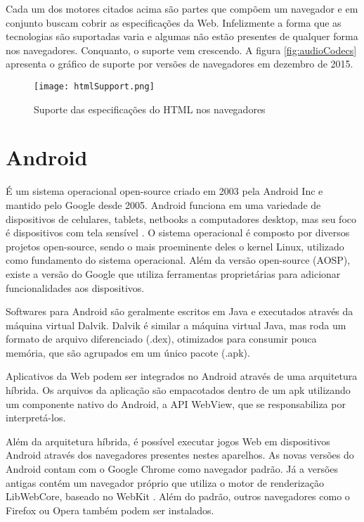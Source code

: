 Cada um dos motores citados acima são partes que compõem um
navegador e em conjunto buscam cobrir as especificações da Web.
Infelizmente a forma que as tecnologias são suportadas varia e algumas
não estão presentes de qualquer forma nos navegadores. Conquanto,
o suporte vem crescendo. A figura \ref{fig:audioCodecs} apresenta o
gráfico de suporte por versões de navegadores em dezembro de 2015.

\begin{figure}[H]
    \centering
    \texttt{[image: htmlSupport.png]}
	\caption{Suporte das especificações do HTML nos navegadores}
    \label{fig:htmlSupport}
\end{figure}

\section{Android}

É um sistema operacional open-source criado em 2003 pela Android
Inc e mantido pelo Google desde 2005. Android funciona em uma
variedade de dispositivos de celulares, tablets, netbooks a
computadores desktop, mas seu foco é dispositivos com tela sensível
\autocite{chromeVsAndroid}. O sistema operacional é composto por
diversos projetos open-source, sendo o mais proeminente deles o kernel
Linux, utilizado como fundamento do sistema operacional. Além
da versão open-source (AOSP), existe a versão do Google que utiliza
ferramentas proprietárias  para adicionar funcionalidades aos dispositivos.

Softwares para Android são geralmente escritos em Java e executados
através da máquina virtual Dalvik. Dalvik é similar a máquina
virtual Java, mas roda um formato de arquivo diferenciado (.dex),
otimizados para consumir pouca memória, que são agrupados em um único
pacote (.apk).

Aplicativos da Web podem ser integrados no Android através de uma
arquitetura híbrida. Os arquivos da aplicação são empacotados dentro
de um apk utilizando um componente nativo do Android, a API WebView, que
se responsabiliza por interpretá-los.

Além da arquitetura híbrida, é possível executar jogos Web em
dispositivos Android através dos navegadores presentes nestes
aparelhos. As novas versões do Android contam com o Google Chrome como
navegador padrão. Já a versões antigas contém um navegador próprio
que utiliza o motor de renderização LibWebCore, baseado no WebKit
\autocite{comparisonPlatforms}. Além do padrão, outros navegadores
como o Firefox ou Opera também podem ser instalados.

